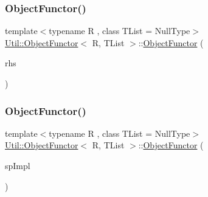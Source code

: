 \mbox{\label{classUtil_1_1ObjectFunctor_a2d42842ec3d69b317aaaafd65cd9e2fd}} 
\subsubsection{\texorpdfstring{ObjectFunctor()}{ObjectFunctor()}\hspace{0.1cm}{\footnotesize\ttfamily [7/15]}}
{\footnotesize\ttfamily template$<$typename R , class T\+List  = Null\+Type$>$ \\
\mbox{\hyperlink{classUtil_1_1ObjectFunctor}{Util\+::\+Object\+Functor}}$<$ R, T\+List $>$\+::\mbox{\hyperlink{classUtil_1_1ObjectFunctor}{Object\+Functor}} (\begin{DoxyParamCaption}\item[{const \mbox{\hyperlink{classUtil_1_1ObjectFunctor}{Object\+Functor}}$<$ R, T\+List $>$ \&}]{rhs }\end{DoxyParamCaption})\hspace{0.3cm}{\ttfamily [inline]}}

\mbox{\label{classUtil_1_1ObjectFunctor_a60702c933bbfec0d0a0e4459debe21b7}} 
\subsubsection{\texorpdfstring{ObjectFunctor()}{ObjectFunctor()}\hspace{0.1cm}{\footnotesize\ttfamily [8/15]}}
{\footnotesize\ttfamily template$<$typename R , class T\+List  = Null\+Type$>$ \\
\mbox{\hyperlink{classUtil_1_1ObjectFunctor}{Util\+::\+Object\+Functor}}$<$ R, T\+List $>$\+::\mbox{\hyperlink{classUtil_1_1ObjectFunctor}{Object\+Functor}} (\begin{DoxyParamCaption}\item[{std\+::auto\+\_\+ptr$<$ \mbox{\hyperlink{classUtil_1_1ObjectFunctor_a93fc635194d1d2768e73ba87d03abd8d}{Impl}} $>$}]{sp\+Impl }\end{DoxyParamCaption})\hspace{0.3cm}{\ttfamily [inline]}}


